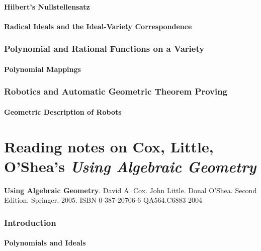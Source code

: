 \documentclass[10pt]{amsart}
\begin{document}
\begin{multicols*}{2}
\subsection{Hilbert's Nullstellensatz}


\subsection{Radical Ideals and the Ideal-Variety Correspondence}



\section{Polynomial and Rational Functions on a Variety}


\subsection{Polynomial Mappings }


\section{Robotics and Automatic Geometric Theorem Proving}



\subsection{Geometric Description of Robots}






\part{Reading notes on Cox, Little, O'Shea's \emph{Using Algebraic Geometry}}

\textbf{Using Algebraic Geometry}.  David A. Cox.  John Little. Donal O'Shea. Second Edition.  Springer.  2005.  ISBN 0-387-20706-6 QA564.C6883 2004

\section{ Introduction }

\subsection{ Polynomials and Ideals }


\end{multicols*}
\end{document}
